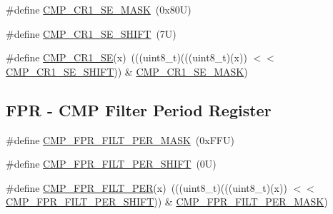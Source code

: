\begin{DoxyCompactItemize}
\item 
\#define \mbox{\hyperlink{group___c_m_p___register___masks_ga899d139651dd67746e73452ff19e892b}{C\+M\+P\+\_\+\+C\+R1\+\_\+\+S\+E\+\_\+\+M\+A\+SK}}~(0x80\+U)
\item 
\#define \mbox{\hyperlink{group___c_m_p___register___masks_ga57cd3f81d8844d4e0509f342ae5170bb}{C\+M\+P\+\_\+\+C\+R1\+\_\+\+S\+E\+\_\+\+S\+H\+I\+FT}}~(7\+U)
\item 
\#define \mbox{\hyperlink{group___c_m_p___register___masks_gab96d1c95a5c8ef96cf9369822ac387f6}{C\+M\+P\+\_\+\+C\+R1\+\_\+\+SE}}(x)~(((uint8\+\_\+t)(((uint8\+\_\+t)(x)) $<$$<$ \mbox{\hyperlink{group___c_m_p___register___masks_ga57cd3f81d8844d4e0509f342ae5170bb}{C\+M\+P\+\_\+\+C\+R1\+\_\+\+S\+E\+\_\+\+S\+H\+I\+FT}})) \& \mbox{\hyperlink{group___c_m_p___register___masks_ga899d139651dd67746e73452ff19e892b}{C\+M\+P\+\_\+\+C\+R1\+\_\+\+S\+E\+\_\+\+M\+A\+SK}})
\end{DoxyCompactItemize}
\subsection*{F\+PR -\/ C\+MP Filter Period Register}
\begin{DoxyCompactItemize}
\item 
\#define \mbox{\hyperlink{group___c_m_p___register___masks_gaf8ca758656c156ecadfbb6f9e57a3eef}{C\+M\+P\+\_\+\+F\+P\+R\+\_\+\+F\+I\+L\+T\+\_\+\+P\+E\+R\+\_\+\+M\+A\+SK}}~(0x\+F\+F\+U)
\item 
\#define \mbox{\hyperlink{group___c_m_p___register___masks_gaa563be7a82c0c1e3802e7ac7c920bf3a}{C\+M\+P\+\_\+\+F\+P\+R\+\_\+\+F\+I\+L\+T\+\_\+\+P\+E\+R\+\_\+\+S\+H\+I\+FT}}~(0\+U)
\item 
\#define \mbox{\hyperlink{group___c_m_p___register___masks_ga006ee9cac0b4b9daa94e3b1d6a440627}{C\+M\+P\+\_\+\+F\+P\+R\+\_\+\+F\+I\+L\+T\+\_\+\+P\+ER}}(x)~(((uint8\+\_\+t)(((uint8\+\_\+t)(x)) $<$$<$ \mbox{\hyperlink{group___c_m_p___register___masks_gaa563be7a82c0c1e3802e7ac7c920bf3a}{C\+M\+P\+\_\+\+F\+P\+R\+\_\+\+F\+I\+L\+T\+\_\+\+P\+E\+R\+\_\+\+S\+H\+I\+FT}})) \& \mbox{\hyperlink{group___c_m_p___register___masks_gaf8ca758656c156ecadfbb6f9e57a3eef}{C\+M\+P\+\_\+\+F\+P\+R\+\_\+\+F\+I\+L\+T\+\_\+\+P\+E\+R\+\_\+\+M\+A\+SK}})
\end{DoxyCompactItemize}
